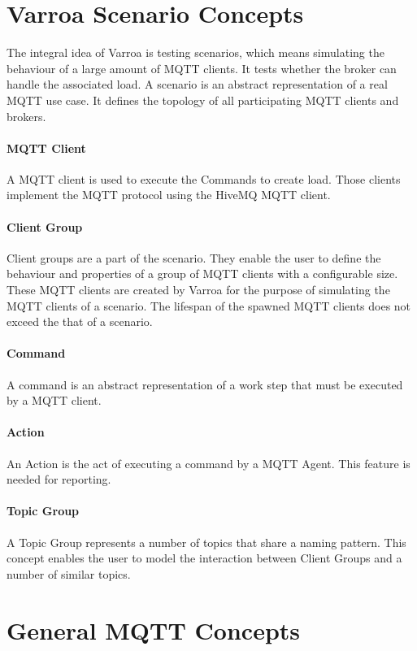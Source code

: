 \section{Varroa Scenario Concepts}
The integral idea of Varroa is testing scenarios, which means simulating the behaviour of a large amount of MQTT clients.
It tests whether the broker can handle the associated load.
A scenario is an abstract representation of a real MQTT use case.
It defines the topology of all participating MQTT clients and brokers.

\paragraph{MQTT Client}
A MQTT client is used to execute the Commands to create load.
Those clients implement the MQTT protocol using the HiveMQ MQTT client.

\paragraph{Client Group}
Client groups are a part of the scenario.
They enable the user to define the behaviour and properties of a group of MQTT clients with a configurable size.
These MQTT clients are created by Varroa for the purpose of simulating the MQTT clients of a scenario.
The lifespan of the spawned MQTT clients does not exceed the that of a scenario.

\paragraph{Command}
A command is an abstract representation of a work step that must be executed by a MQTT client.

\paragraph{Action}
An Action is the act of executing a command by a MQTT Agent.
This feature is needed for reporting.

\paragraph{Topic Group}
A Topic Group represents a number of topics that share a naming pattern.
This concept enables the user to model the interaction between Client Groups and a number of similar topics.

\section{General MQTT Concepts}
